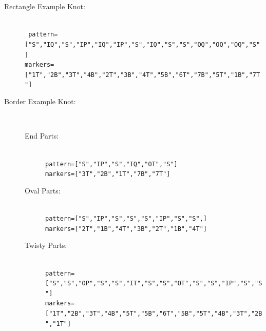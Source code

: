 \documentclass[openany]{book}
\newcommand{\RK}{Rectangle Example Knot}
\newcommand{\BK}{Border Example Knot}
\begin{document}
\begin{description}
\item[\RK:]$ $\\
\texttt{ pattern=["S","IQ","S","IP","IQ","IP","S","IQ","S","S","OQ","OQ","OQ","S"]}\\
\texttt{markers=["1T","2B","3T","4B","2T","3B","4T","5B","6T","7B","5T","1B","7T"]}

\item[\BK:]$ $
\begin{description}
\item[End Parts:]$ $\\
\texttt{pattern=["S","IP","S","IQ","OT","S"]}\\
\texttt{markers=["3T","2B","1T","7B","7T"]}

\item[Oval Parts:]$ $\\
\texttt{pattern=["S","IP","S","S","S","IP","S","S",]}\\
\texttt{markers=["2T","1B","4T","3B","2T","1B","4T"]}

\item[Twisty Parts:]$ $\\
\texttt{pattern=["S","S","OP","S","S","IT","S","S","OT","S","S","IP","S","S"]}\\
\texttt{markers=["1T","2B","3T","4B","5T","5B","6T","5B","5T","4B","3T","2B","1T"]}

\end{description}
\end{description}
\end{document}
